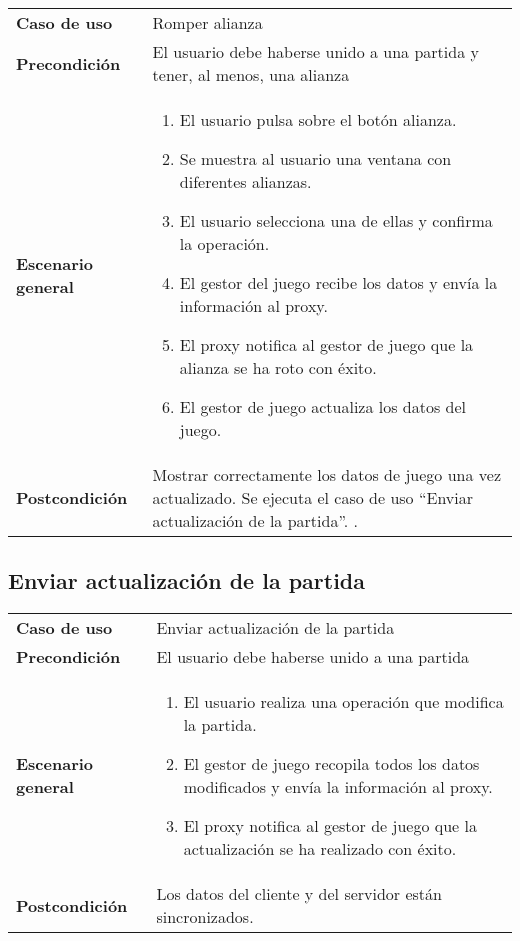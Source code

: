 {\footnotesize
\begin{tabularx}{0.95\textwidth}{p{}|X}

\textbf{Caso de uso} & Romper alianza \\

\textbf{Precondición} & El usuario debe haberse unido a una partida y tener, al
menos, una alianza \\

\textbf{Escenario general} & \begin{enumerate}
\item El usuario pulsa sobre el botón alianza.
\item Se muestra al usuario una ventana con diferentes alianzas.
\item El usuario selecciona una de ellas y confirma la operación.
\item El gestor del juego recibe los datos y envía la información al proxy.
\item El proxy notifica al gestor de juego que la alianza se ha roto con éxito.
\item El gestor de juego actualiza los datos del juego.
\end{enumerate} \\

\textbf{Postcondición} & Mostrar correctamente los datos de juego una vez
actualizado. Se ejecuta el caso de uso  ``Enviar actualización de
la partida''. .

\end{tabularx}
}

\subsection{Enviar actualización de la partida}

{\footnotesize
\begin{tabularx}{0.95\textwidth}{p{}|X}

\textbf{Caso de uso} & Enviar actualización de la partida \\

\textbf{Precondición} & El usuario debe haberse unido a una partida \\

\textbf{Escenario general} & \begin{enumerate}
\item El usuario realiza una operación que modifica la partida.
\item El gestor de juego recopila todos los datos modificados y envía la
información al proxy.
\item El proxy notifica al gestor de juego que la actualización se ha realizado
con éxito.
\end{enumerate} \\
\textbf{Postcondición} & Los datos del cliente y del servidor están
sincronizados.

\end{tabularx}
}

